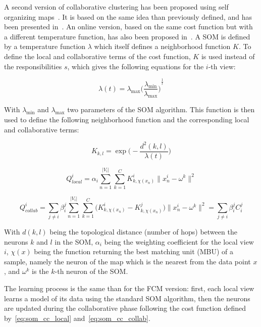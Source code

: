     A second version of collaborative clustering has been proposed using self organizing maps~\cite{kohonen1998self}. It is based on the same idea than previously defined, and has been presented in~\cite{grozavu2010topological}. An online version, based on the same cost function but with a different temperature function, has also been proposed in~\cite{maurel2017incremental}. A SOM is defined by a temperature function $\lambda$ which itself defines a neighborhood function $K$. To define the local and collaborative terms of the cost function, $K$ is used instead of the responsibilities $s$, which gives the following equations for the $i$-th view:

    \begin{equation}
    \lambda(t) = \lambda_{\max}{\Big(\frac{\lambda_{\min}}{\lambda_{\max}}\Big)}^{\frac{1}{t}}
        \label{eq:som_temp}
    \end{equation}

    With $\lambda_{\min}$ and $\lambda_{\max}$ two parameters of the SOM algorithm. This function is then used to define the following neighborhood function and the corresponding local and collaborative terms:

    \begin{equation}
        K_{k,l} = \exp\Big(-\frac{d^2(k,l)}{\lambda(t)}\Big)
        \label{eq:som_neigh}
    \end{equation}

    \begin{equation}
        Q_{local}^i = \alpha_i \sum_{n=1}^{|V_i|}\sum_{k=1}^C K^i_{k,\chi(x_n)}\|x_n^i - \omega^k \|^2 
        \label{eq:som_cc_local}
    \end{equation}

    \begin{equation}
        Q_{collab}^i = \sum_{j \neq i}\beta_i^j \sum_{n=1}^{|V_i|}\sum_{k=1}^C \big(K^i_{k,\chi(x_n)} - K^j_{k,\chi(x_n)}\big)\|x_n^i - \omega^k \|^2 = \sum_{j \neq i} \beta_i^j C_i^j 
        \label{eq:som_cc_collab}
    \end{equation}

    With $d(k,l)$ being the topological distance (number of hops) between the neurons $k$ and $l$ in the SOM, $\alpha_i$ being the weighting coefficient for the local view $i$, $\chi(x)$ being the function returning the best matching unit (MBU) of a sample, namely the neuron of the map which is the nearest from the data point $x$, and $\omega^k$ is the $k$-th neuron of the SOM.\@

    The learning process is the same than for the FCM version: first, each local view learns a model of its data using the standard SOM algorithm, then the neurons are updated during the collaborative phase following the cost function defined by~\ref{eq:som_cc_local} and~\ref{eq:som_cc_collab}.

